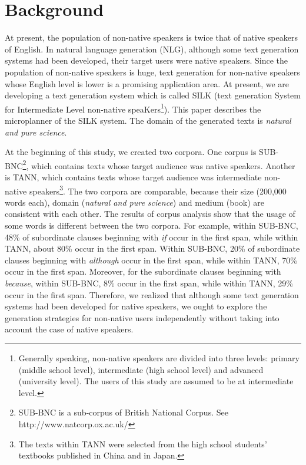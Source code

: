 \documentclass[english]{jnlp_1.2.0}
\begin{document}
\maketitle





\section{Background} 

At present, the population of non-native speakers is twice that 
of native speakers of English. In natural language generation (NLG), 
although some text generation systems \cite{McKeown85,Goldberg94,Bateman97} 
had been developed, their target users were native speakers. Since 
the population of non-native speakers is huge, text generation
for non-native speakers whose English level is lower is a promising 
application area. At present, we are developing a text generation
system which is called SILK (text generation System for Intermediate Level non-native
speaKers\footnote{Generally speaking, non-native speakers are divided into three levels: primary (middle school level), intermediate (high school level) and advanced (university level). The users of this study are assumed to be at intermediate level.}). This paper 
describes the microplanner of the SILK system. The domain of the
generated texts is \textit{natural and pure science}.


At the beginning of this study, we created two corpora. One corpus is 
SUB-BNC\footnote{SUB-BNC is a sub-corpus of British National Corpus. See http://www.natcorp.ox.ac.uk/}, which contains texts whose target audience was native speakers. 
Another is TANN, which contains texts whose target audience was 
intermediate non-native speakers\footnote{The texts within TANN were selected from the high school students' textbooks published in China and in Japan.}. The two corpora are comparable, 
because their size (200,000 words each), domain 
(\textit{natural and pure science}) and medium (book) are consistent with
each other. The results of corpus analysis show that the usage of some words is 
different between the two corpora. For example, within SUB-BNC, 48\% 
of subordinate clauses beginning with \textit{if} occur in the first span, 
while within TANN, about 80\% occur in the first span. Within SUB-BNC, 
20\% of subordinate clauses beginning with \textit{although} occur in 
the first span, while within TANN, 70\% occur in the first span. 
Moreover, for the subordinate clauses beginning with \textit{because}, within 
SUB-BNC, 8\% occur in the first span, while within TANN, 29\% 
occur in the first span. Therefore, we realized that although some 
text generation systems had been developed for native speakers, 
we ought to explore the generation strategies for non-native 
users independently without taking into account the case of native speakers.
\end{document}
